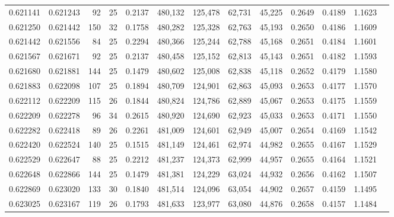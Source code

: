 \begin{tabular}{rrrrrrrrrrrrr}
0.621141 & 0.621243 &    92 &  25 &                                     0.2137 & 480,132 & 125,478 &  62,731 &  45,225 & 0.2649 & 0.4189 & 1.1623 \\
0.621250 & 0.621442 &   150 &  32 &                                     0.1758 & 480,282 & 125,328 &  62,763 &  45,193 & 0.2650 & 0.4186 & 1.1609 \\
0.621442 & 0.621556 &    84 &  25 &                                     0.2294 & 480,366 & 125,244 &  62,788 &  45,168 & 0.2651 & 0.4184 & 1.1601 \\
0.621567 & 0.621671 &    92 &  25 &                                     0.2137 & 480,458 & 125,152 &  62,813 &  45,143 & 0.2651 & 0.4182 & 1.1593 \\
0.621680 & 0.621881 &   144 &  25 &                                     0.1479 & 480,602 & 125,008 &  62,838 &  45,118 & 0.2652 & 0.4179 & 1.1580 \\
0.621883 & 0.622098 &   107 &  25 &                                     0.1894 & 480,709 & 124,901 &  62,863 &  45,093 & 0.2653 & 0.4177 & 1.1570 \\
0.622112 & 0.622209 &   115 &  26 &                                     0.1844 & 480,824 & 124,786 &  62,889 &  45,067 & 0.2653 & 0.4175 & 1.1559 \\
0.622209 & 0.622278 &    96 &  34 &                                     0.2615 & 480,920 & 124,690 &  62,923 &  45,033 & 0.2653 & 0.4171 & 1.1550 \\
0.622282 & 0.622418 &    89 &  26 &                                     0.2261 & 481,009 & 124,601 &  62,949 &  45,007 & 0.2654 & 0.4169 & 1.1542 \\
0.622420 & 0.622524 &   140 &  25 &                                     0.1515 & 481,149 & 124,461 &  62,974 &  44,982 & 0.2655 & 0.4167 & 1.1529 \\
0.622529 & 0.622647 &    88 &  25 &                                     0.2212 & 481,237 & 124,373 &  62,999 &  44,957 & 0.2655 & 0.4164 & 1.1521 \\
0.622648 & 0.622866 &   144 &  25 &                                     0.1479 & 481,381 & 124,229 &  63,024 &  44,932 & 0.2656 & 0.4162 & 1.1507 \\
0.622869 & 0.623020 &   133 &  30 &                                     0.1840 & 481,514 & 124,096 &  63,054 &  44,902 & 0.2657 & 0.4159 & 1.1495 \\
0.623025 & 0.623167 &   119 &  26 &                                     0.1793 & 481,633 & 123,977 &  63,080 &  44,876 & 0.2658 & 0.4157 & 1.1484 \\

\end{tabular}
